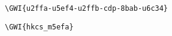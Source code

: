 \documentclass{jlreq}
\begin{document}
\begin{verbatim}
\GWI{u2ffa-u5ef4-u2ffb-cdp-8bab-u6c34}
\end{verbatim}


\begin{verbatim}
\GWI{hkcs_m5efa}
\end{verbatim}

\end{document}
